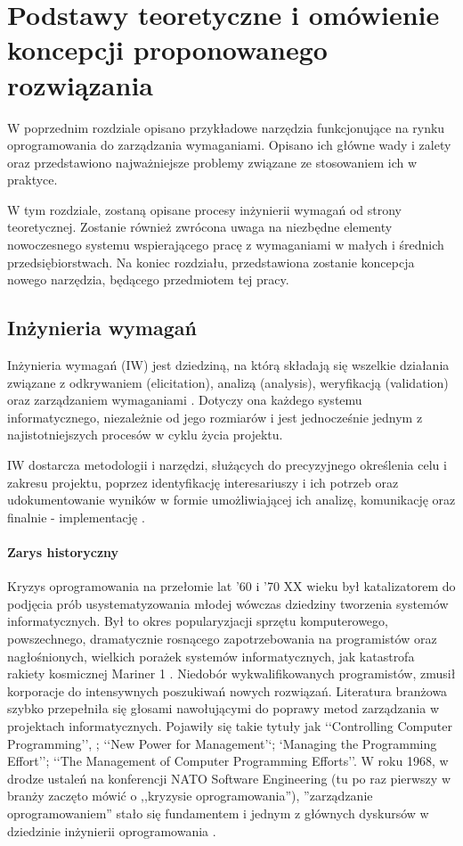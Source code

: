 \chapter{Podstawy teoretyczne i omówienie koncepcji proponowanego rozwiązania}
  
  W poprzednim rozdziale opisano przykładowe narzędzia funkcjonujące na rynku oprogramowania do zarządzania wymaganiami. Opisano ich główne wady i zalety oraz przedstawiono najważniejsze problemy związane ze stosowaniem ich w praktyce.

  W tym rozdziale, zostaną opisane procesy inżynierii wymagań od strony teoretycznej. Zostanie również zwrócona uwaga na niezbędne elementy nowoczesnego systemu wspierającego pracę z wymaganiami w małych i średnich przedsiębiorstwach. Na koniec rozdziału, przedstawiona zostanie koncepcja nowego narzędzia, będącego przedmiotem tej pracy.
  
  \section{Inżynieria wymagań}
    
    Inżynieria wymagań (IW) jest dziedziną, na którą składają się wszelkie działania związane z odkrywaniem (elicitation), analizą (analysis), weryfikacją (validation) oraz zarządzaniem wymaganiami \cite{Somm06}. Dotyczy ona każdego systemu informatycznego, niezależnie od jego rozmiarów i jest jednocześnie jednym z najistotniejszych procesów w cyklu życia projektu.

    IW dostarcza metodologii i narzędzi, służących do precyzyjnego określenia celu i zakresu projektu, poprzez identyfikację interesariuszy i ich potrzeb oraz udokumentowanie wyników w formie umożliwiającej ich analizę, komunikację oraz finalnie - implementację \cite{Nus00}. 

      \subsubsection{Zarys historyczny}

        Kryzys oprogramowania na przełomie lat '60 i '70 XX wieku był katalizatorem do podjęcia prób usystematyzowania młodej wówczas dziedziny tworzenia systemów informatycznych. Był to okres popularyzjacji sprzętu komputerowego, powszechnego, dramatycznie rosnącego zapotrzebowania na programistów oraz nagłośnionych, wielkich porażek systemów informatycznych, jak katastrofa rakiety kosmicznej Mariner 1 \cite{Brooks75}. Niedobór wykwalifikowanych programistów, zmusił korporacje do intensywnych poszukiwań nowych rozwiązań. Literatura branżowa szybko przepełniła się głosami nawołującymi do poprawy metod zarządzania w projektach informatycznych. Pojawiły się takie tytuły jak ‘‘Controlling Computer Programming’’, ; ‘‘New Power for Management’‘; ‘Managing the Programming Effort’’; ‘‘The Management of Computer Programming Efforts’’. W roku 1968, w drodze ustaleń na konferencji NATO Software Engineering (tu po raz pierwszy w branży zaczęto mówić o ,,kryzysie oprogramowania''), ''zarządzanie oprogramowaniem'' stało się fundamentem i jednym z głównych dyskursów w dziedzinie inżynierii oprogramowania \cite{Ense03}.
        
